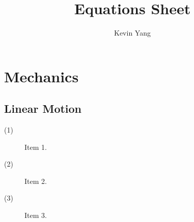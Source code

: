 \documentclass[titlepage]{article}
\title{Equations Sheet}
\author{Kevin Yang}
\date{}
\begin{document}
\maketitle
\section{Mechanics}
\subsection{Linear Motion}
	\begin{description}
	\item[(1)] Item 1.
	\item[(2)] Item 2.
	\item[(3)] Item 3.
	\end{description}
\end{document}
